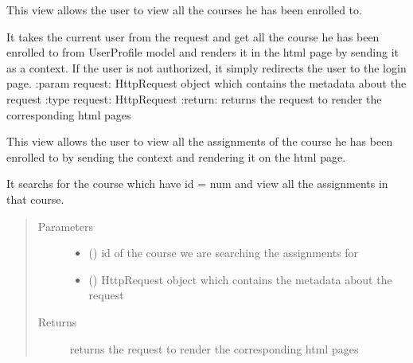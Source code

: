 \documentclass[letterpaper,10pt,english]{sphinxmanual}
\begin{document}

\begin{fulllineitems}
\label{\detokenize{users:users.views.allcourses_views}}
\sphinxAtStartPar
This view allows the user to view all the courses he has been enrolled to.

\sphinxAtStartPar
It takes the current user from the request and get all the course he has been enrolled to from UserProfile model and renders it in the html page by sending it as a context.
If the user is not authorized, it simply redirects the user to the login page.
:param request: HttpRequest object which contains the metadata about the request
:type request: HttpRequest
:return: returns the request to render the corresponding html pages

\end{fulllineitems}


\begin{fulllineitems}
\label{\detokenize{users:users.views.assignment_views}}
\sphinxAtStartPar
This view allows the user to view all the assignments of the course he has been enrolled to by sending the context and rendering it on the html page.

\sphinxAtStartPar
It searchs for the course which have id = num and view all the assignments in that course.
\begin{quote}\begin{description}
\item[{Parameters}] \leavevmode\begin{itemize}
\item {} 
\sphinxAtStartPar
{} () \textendash{} id of the course we are searching the assignments for

\item {} 
\sphinxAtStartPar
{} () \textendash{} HttpRequest object which contains the metadata about the request

\end{itemize}

\item[{Returns}] \leavevmode
\sphinxAtStartPar
returns the request to render the corresponding html pages

\end{description}\end{quote}

\end{fulllineitems}
\end{document}
